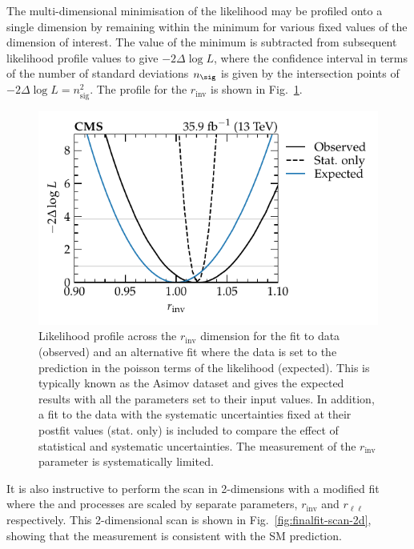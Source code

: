 The multi-dimensional minimisation of the likelihood may be profiled onto a single dimension by remaining within the minimum for various fixed values of the dimension of interest. The value of the minimum is subtracted from subsequent likelihood profile values to give $-2\Delta\log L$, where the confidence interval in terms of the number of standard deviations $n_{\sig}$ is given by the intersection points of $-2\Delta\log L=n_{\mathrm{sig}}^2$.  The profile for the $r_{\mathrm{inv}}$ is shown in Fig.~\ref{fig:finalfit-scan-1d}.
%
\begin{figure}
    \centering
    \includegraphics{chapters/043_results/images/finalfit-scan-1d.pdf}
    \caption[Likelihood profile in the $r_{\mathrm{inv}}$ dimension.]{
        Likelihood profile across the $r_{\mathrm{inv}}$ dimension for the fit to data (observed) and an alternative fit where the data is set to the prediction in the poisson terms of the likelihood (expected). This is typically known as the Asimov dataset and gives the expected results with all the parameters set to their input values. In addition, a fit to the data with the systematic uncertainties fixed at their postfit values (stat. only) is included to compare the effect of statistical and systematic uncertainties. The measurement of the $r_{\mathrm{inv}}$ parameter is systematically limited.
    }
    \label{fig:finalfit-scan-1d}
\end{figure}
%
It is also instructive to perform the scan in 2-dimensions with a modified fit where the \IZvvj and \IZllj processes are scaled by separate parameters, $r_{\mathrm{inv}}$ and $r_{\ell\ell}$ respectively. This 2-dimensional scan is shown in Fig.~\ref{fig:finalfit-scan-2d}, showing that the measurement is consistent with the SM prediction.
%
